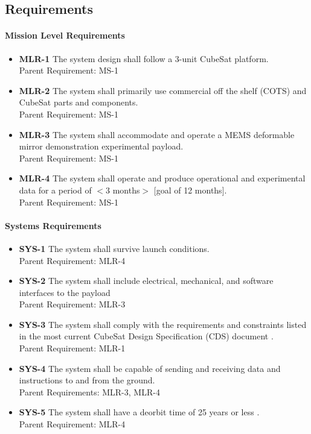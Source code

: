 \documentclass[12pt]{article}
\begin{document}
		\subsection{Requirements}

		\paragraph{Mission Level Requirements}
		\begin{itemize}
				\item \textbf{MLR-1} The system design shall follow a 3-unit CubeSat platform.\\
				Parent Requirement: MS-1
				\item \textbf{MLR-2} The system shall primarily use commercial off the shelf (COTS) and CubeSat parts and components.\\
				Parent Requirement: MS-1
				\item \textbf{MLR-3} The system shall accommodate and operate a MEMS deformable mirror demonstration experimental payload.\\
				Parent Requirement: MS-1
				\item \textbf{MLR-4} The system shall operate and produce operational and experimental data for a period of $<$3 months$>$ [goal of 12 months].\\
				Parent Requirement: MS-1
		\end{itemize}

		\paragraph{Systems Requirements}

		\begin{itemize}
			\item \textbf{SYS-1} The system shall survive launch conditions.\\
			Parent Requirement: MLR-4
			\item \textbf{SYS-2} The system shall include electrical, mechanical, and software interfaces to the payload\\
			Parent Requirement: MLR-3
			\item \textbf{SYS-3} The system shall comply with the requirements and constraints listed in the most current CubeSat Design Specification (CDS) document \cite{mission_cubesat}. \\
			Parent Requirement: MLR-1
			\item \textbf{SYS-4} The system shall be capable of sending and receiving data and instructions to and from the ground.\\
			Parent Requirements: MLR-3, MLR-4
			\item \textbf{SYS-5} The system shall have a deorbit time of 25 years or less \cite{mission_deorbit}.\\
			Parent Requirement: MLR-4
		\end{itemize}
\end{document}
